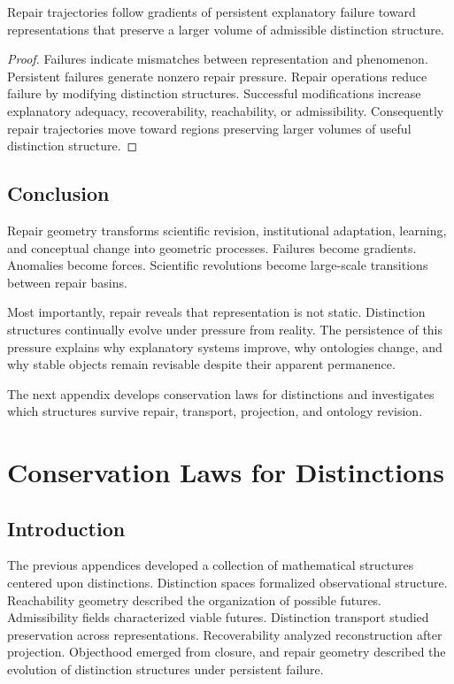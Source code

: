 \documentclass[11pt,oneside,openany]{book}
\begin{document}
\begin{theorem}

Repair trajectories follow gradients of persistent explanatory failure toward representations that preserve a larger volume of admissible distinction structure.

\end{theorem}

\begin{proof}

Failures indicate mismatches between representation and phenomenon. Persistent failures generate nonzero repair pressure. Repair operations reduce failure by modifying distinction structures. Successful modifications increase explanatory adequacy, recoverability, reachability, or admissibility. Consequently repair trajectories move toward regions preserving larger volumes of useful distinction structure.

\end{proof}

\section{Conclusion}

Repair geometry transforms scientific revision, institutional adaptation, learning, and conceptual change into geometric processes. Failures become gradients. Anomalies become forces. Scientific revolutions become large-scale transitions between repair basins.

Most importantly, repair reveals that representation is not static. Distinction structures continually evolve under pressure from reality. The persistence of this pressure explains why explanatory systems improve, why ontologies change, and why stable objects remain revisable despite their apparent permanence.

The next appendix develops conservation laws for distinctions and investigates which structures survive repair, transport, projection, and ontology revision.

\chapter{Conservation Laws for Distinctions}

\section{Introduction}

The previous appendices developed a collection of mathematical structures centered upon distinctions. Distinction spaces formalized observational structure. Reachability geometry described the organization of possible futures. Admissibility fields characterized viable futures. Distinction transport studied preservation across representations. Recoverability analyzed reconstruction after projection. Objecthood emerged from closure, and repair geometry described the evolution of distinction structures under persistent failure.
\end{document}
